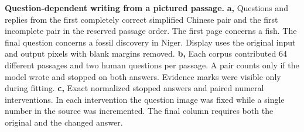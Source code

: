 \textbf{Question-dependent writing from a pictured passage.}
\textbf{a,} Questions and replies from the first completely correct simplified Chinese pair and the first incomplete pair in the reserved passage order. The first page concerns a fish. The final question concerns a fossil discovery in Niger. Display uses the original input and output pixels with blank margins removed. \textbf{b,} Each corpus contributed 64 different passages and two human questions per passage. A pair counts only if the model wrote and stopped on both answers. Evidence marks were visible only during fitting. \textbf{c,} Exact normalized stopped answers and paired numeral interventions. In each intervention the question image was fixed while a single number in the source was incremented. The final column requires both the original and the changed answer.
